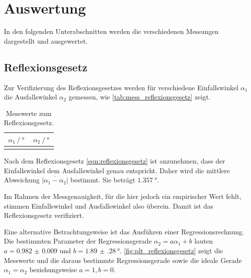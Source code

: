 \section{Auswertung}
\label{sec:auswertung}
In den folgenden Unterabschnitten werden die verschiedenen Messungen dargestellt und ausgewertet.

\FloatBarrier %
\subsection{Reflexionsgesetz}
\label{sec:auswertung:reflexionsgesetz}
Zur Verifizierung des Reflexionsgesetzes werden
für verschiedene Einfallswinkel $\alpha_1$ die Ausfallswinkel $\alpha_2$ gemessen,
wie \autoref{tab:mess_reflexionsgesetz} zeigt.

\begin{table}
    \centering
    \caption{Messwerte zum Reflexionsgesetz.}
    \label{tab:mess_reflexionsgesetz}
    \begin{tabular}{S S}
        \toprule
        {$\alpha_1 \mathbin{/} \si{\degree}$} &
        {$\alpha_2 \mathbin{/} \si{\degree}$} \\
        \midrule
        \bottomrule
    \end{tabular}
\end{table}

Nach dem Reflexionsgesetz \eqref{eqn:reflexionsgesetz} ist anzunehmen,
dass der Einfallswinkel dem Ausfallswinkel genau entspricht.
Daher wird die mittlere Abweichung $\overline{|\alpha_1 - \alpha_2|}$ bestimmt.
Sie beträgt $\SI{1.357}{\degree}$.

Im Rahmen der Messgenauigkeit,
für die hier jedoch ein empirischer Wert fehlt,
stimmen Einfallswinkel und Ausfallswinkel also überein.
Damit ist das Reflexionsgesetz verifiziert.


Eine alternative Betrachtungsweise ist das Ausführen einer Regressionsrechnung.
Die bestimmten Parameter der Regressionsgerade $\alpha_2 = a \alpha_1 + b$ lauten
$a = \num{0.982(9)}$ und $b = \SI{1.89(28)}{\degree}$.
\autoref{fig:plt_reflexionsgesetz} zeigt die Messwerte und die daraus bestimmte Regressionsgerade
sowie die ideale Gerade $\alpha_1 = \alpha_2$ beziehungsweise $a=1, b=0$.

